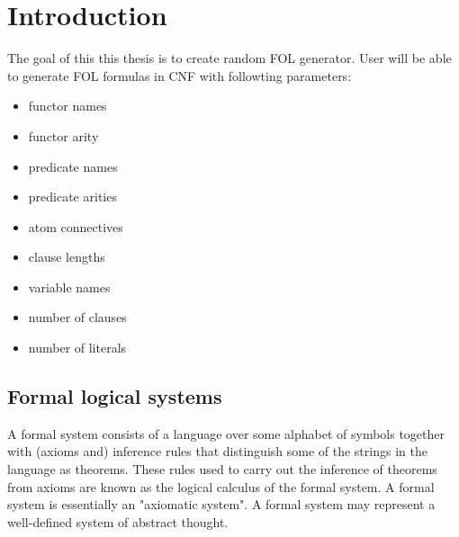 \chapter{Introduction}

The goal of this this thesis is to create random \gls{FOL} generator. User will be able to generate \gls{FOL} formulas in \gls{CNF} with followting parameters:
\begin{itemize}
  \item functor names 
  \item functor arity
  \item predicate names 
  \item predicate arities
  \item atom connectives
  \item clause lengths
  \item variable names
  \item number of clauses
  \item number of literals
\end{itemize}


% 
% 

\section{Formal logical systems}

A formal system consists of a language over some alphabet of symbols together with (axioms and) inference rules that distinguish some of the strings in the language as theorems.
These rules used to carry out the inference of theorems from axioms are known as the logical calculus of the formal system. A formal system is essentially an "axiomatic system". A formal system may represent a well-defined system of abstract thought.

